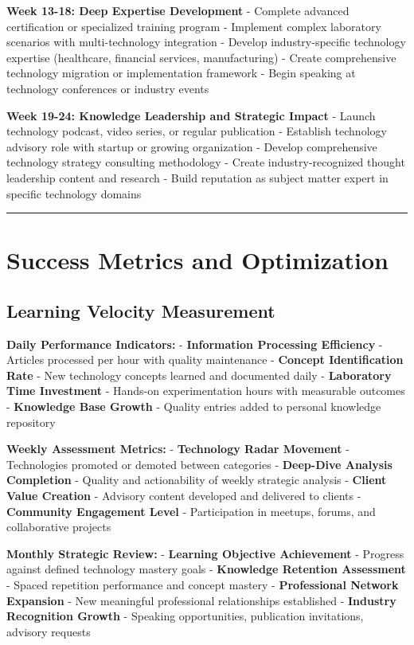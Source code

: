 \documentclass[
  letterpaper,
  DIV=11,
  numbers=noendperiod]{scrartcl}
\begin{document}
\textbf{Week 13-18: Deep Expertise Development} - Complete advanced
certification or specialized training program - Implement complex
laboratory scenarios with multi-technology integration - Develop
industry-specific technology expertise (healthcare, financial services,
manufacturing) - Create comprehensive technology migration or
implementation framework - Begin speaking at technology conferences or
industry events

\textbf{Week 19-24: Knowledge Leadership and Strategic Impact} - Launch
technology podcast, video series, or regular publication - Establish
technology advisory role with startup or growing organization - Develop
comprehensive technology strategy consulting methodology - Create
industry-recognized thought leadership content and research - Build
reputation as subject matter expert in specific technology domains

\begin{center}\rule{0.5\linewidth}{0.5pt}\end{center}

\section{Success Metrics and
Optimization}\label{success-metrics-and-optimization}

\subsection{Learning Velocity
Measurement}\label{learning-velocity-measurement}

\textbf{Daily Performance Indicators:} - \textbf{Information Processing
Efficiency} - Articles processed per hour with quality maintenance -
\textbf{Concept Identification Rate} - New technology concepts learned
and documented daily - \textbf{Laboratory Time Investment} - Hands-on
experimentation hours with measurable outcomes - \textbf{Knowledge Base
Growth} - Quality entries added to personal knowledge repository

\textbf{Weekly Assessment Metrics:} - \textbf{Technology Radar Movement}
- Technologies promoted or demoted between categories -
\textbf{Deep-Dive Analysis Completion} - Quality and actionability of
weekly strategic analysis - \textbf{Client Value Creation} - Advisory
content developed and delivered to clients - \textbf{Community
Engagement Level} - Participation in meetups, forums, and collaborative
projects

\textbf{Monthly Strategic Review:} - \textbf{Learning Objective
Achievement} - Progress against defined technology mastery goals -
\textbf{Knowledge Retention Assessment} - Spaced repetition performance
and concept mastery - \textbf{Professional Network Expansion} - New
meaningful professional relationships established - \textbf{Industry
Recognition Growth} - Speaking opportunities, publication invitations,
advisory requests
\end{document}
